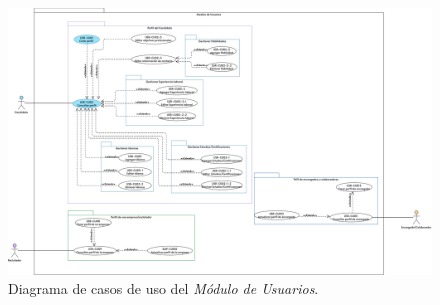 	\begin{figure}[hbtp!]
		\begin{center}
			\includegraphics[width=1 \textwidth]{anexos/imagenes/CUUSR.png}
		\end{center}
		
		\caption{Diagrama de casos de uso del \textit{Módulo de Usuarios}.}
		\label{adcu:usr}
	\end{figure}

	
	

	
	
	
	
	
	
	
	
	
	
	
	
	
	
	
	
	
	
	
	
	
	
	

	
	
	
	
	
	
	
	
	
